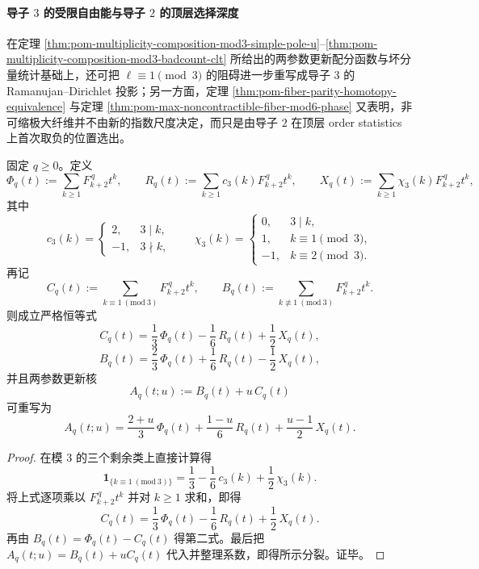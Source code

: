 \paragraph{导子 \texorpdfstring{$3$}{3} 的受限自由能与导子 \texorpdfstring{$2$}{2} 的顶层选择深度}
在定理 \ref{thm:pom-multiplicity-composition-mod3-simple-pole-u}--\ref{thm:pom-multiplicity-composition-mod3-badcount-clt} 所给出的两参数更新配分函数与坏分量统计基础上，还可把 \(\ell\equiv 1\pmod 3\) 的阻碍进一步重写成导子 \(3\) 的 Ramanujan--Dirichlet 投影；另一方面，定理 \ref{thm:pom-fiber-parity-homotopy-equivalence} 与定理 \ref{thm:pom-max-noncontractible-fiber-mod6-phase} 又表明，非可缩极大纤维并不由新的指数尺度决定，而只是由导子 \(2\) 在顶层 order statistics 上首次取负的位置选出。

\begin{theorem}\label{thm:conclusion-bad-component-ramanujan-dirichlet-splitting}
固定 \(q\ge 0\)。定义
\[
\Phi_q(t):=\sum_{k\ge 1}F_{k+2}^{\,q}t^k,
\qquad
R_q(t):=\sum_{k\ge 1}c_3(k)F_{k+2}^{\,q}t^k,
\qquad
X_q(t):=\sum_{k\ge 1}\chi_3(k)F_{k+2}^{\,q}t^k,
\]
其中
\[
c_3(k)=
\begin{cases}
2,& 3\mid k,\\
-1,& 3\nmid k,
\end{cases}
\qquad
\chi_3(k)=
\begin{cases}
0,& 3\mid k,\\
1,& k\equiv 1\pmod 3,\\
-1,& k\equiv 2\pmod 3.
\end{cases}
\]
再记
\[
C_q(t):=\sum_{k\equiv 1\ (\mathrm{mod}\ 3)}F_{k+2}^{\,q}t^k,
\qquad
B_q(t):=\sum_{k\not\equiv 1\ (\mathrm{mod}\ 3)}F_{k+2}^{\,q}t^k.
\]
则成立严格恒等式
\[
C_q(t)=\frac13\,\Phi_q(t)-\frac16\,R_q(t)+\frac12\,X_q(t),
\]
\[
B_q(t)=\frac23\,\Phi_q(t)+\frac16\,R_q(t)-\frac12\,X_q(t),
\]
并且两参数更新核
\[
A_q(t;u):=B_q(t)+u\,C_q(t)
\]
可重写为
\[
A_q(t;u)
=
\frac{2+u}{3}\,\Phi_q(t)
+\frac{1-u}{6}\,R_q(t)
+\frac{u-1}{2}\,X_q(t).
\]
\end{theorem}
\begin{proof}
在模 \(3\) 的三个剩余类上直接计算得
\[
\mathbf 1_{\{k\equiv 1\ (\mathrm{mod}\ 3)\}}
=
\frac13-\frac16\,c_3(k)+\frac12\,\chi_3(k).
\]
将上式逐项乘以 \(F_{k+2}^{\,q}t^k\) 并对 \(k\ge 1\) 求和，即得
\[
C_q(t)=\frac13\,\Phi_q(t)-\frac16\,R_q(t)+\frac12\,X_q(t).
\]
再由 \(B_q(t)=\Phi_q(t)-C_q(t)\) 得第二式。最后把 \(A_q(t;u)=B_q(t)+uC_q(t)\) 代入并整理系数，即得所示分裂。证毕。
\end{proof}

